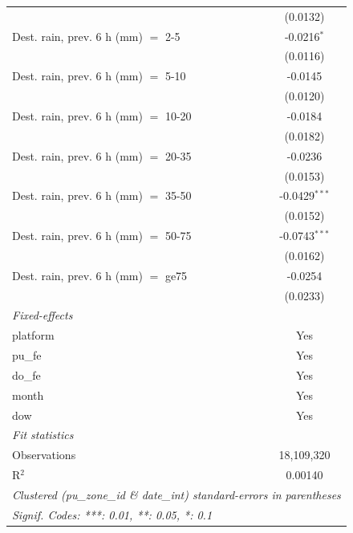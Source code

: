 \begin{tabular}{lc}
                                                 & (0.0132)\\   
   Dest. rain, prev. 6 h (mm) $=$ 2-5            & -0.0216$^{*}$\\   
                                                 & (0.0116)\\   
   Dest. rain, prev. 6 h (mm) $=$ 5-10           & -0.0145\\   
                                                 & (0.0120)\\   
   Dest. rain, prev. 6 h (mm) $=$ 10-20          & -0.0184\\   
                                                 & (0.0182)\\   
   Dest. rain, prev. 6 h (mm) $=$ 20-35          & -0.0236\\   
                                                 & (0.0153)\\   
   Dest. rain, prev. 6 h (mm) $=$ 35-50          & -0.0429$^{***}$\\   
                                                 & (0.0152)\\   
   Dest. rain, prev. 6 h (mm) $=$ 50-75          & -0.0743$^{***}$\\   
                                                 & (0.0162)\\   
   Dest. rain, prev. 6 h (mm) $=$ ge75           & -0.0254\\   
                                                 & (0.0233)\\   
   \midrule
   \emph{Fixed-effects}\\
   platform                                      & Yes\\  
   pu\_fe                                        & Yes\\  
   do\_fe                                        & Yes\\  
   month                                         & Yes\\  
   dow                                           & Yes\\  
   \midrule
   \emph{Fit statistics}\\
   Observations                                  & 18,109,320\\  
   R$^2$                                         & 0.00140\\  
   \midrule \midrule
   \multicolumn{2}{l}{\emph{Clustered (pu\_zone\_id \& date\_int) standard-errors in parentheses}}\\
   \multicolumn{2}{l}{\emph{Signif. Codes: ***: 0.01, **: 0.05, *: 0.1}}\\
\end{tabular}
 
